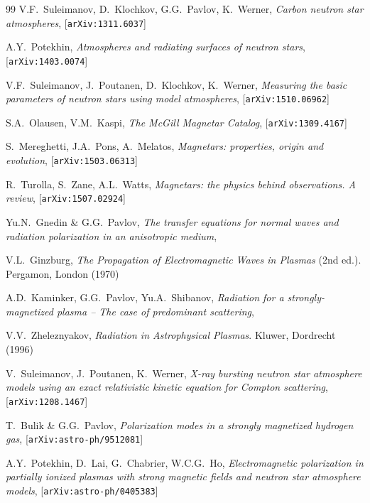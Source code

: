 \documentclass{pos1}
\begin{document}
\begin{thebibliography}{99}
V.F.~Suleimanov, D.~Klochkov, G.G.~Pavlov, K.~Werner,
\textit{Carbon neutron star atmospheres},
[\texttt{arXiv:1311.6037}]

A.Y.~Potekhin,
\textit{Atmospheres and radiating surfaces of neutron stars},
[\texttt{arXiv:1403.0074}]

V.F.~Suleimanov, J.~Poutanen, D.~Klochkov, K.~Werner,
\textit{Measuring the basic parameters of neutron stars using model atmospheres},
[\texttt{arXiv:1510.06962}]

S.A.~Olausen, V.M.~Kaspi,
\textit{The McGill Magnetar Catalog},
[\texttt{arXiv:1309.4167}]

S.~Mereghetti, J.A.~Pons, A.~Melatos,
\textit{Magnetars: properties, origin and evolution},
[\texttt{arXiv:1503.06313}]

R.~Turolla, S.~Zane, A.L.~Watts,
\textit{Magnetars: the physics behind observations. A review},
[\texttt{arXiv:1507.02924}]

Yu.N.~Gnedin \& G.G.~Pavlov,
\textit{The transfer equations for normal waves and radiation polarization in an anisotropic medium},

V.L.~Ginzburg,
\textit{The Propagation of Electromagnetic Waves in Plasmas}
(2nd ed.). Pergamon, London (1970)

A.D.~Kaminker, G.G.~Pavlov, Yu.A.~Shibanov,
\textit{Radiation for a strongly-magnetized plasma -- The case of predominant scattering},

V.V.~Zheleznyakov,
\textit{Radiation in Astrophysical Plasmas}.
Kluwer, Dordrecht (1996)

V.~Suleimanov, J.~Poutanen, K.~Werner,
\textit{X-ray bursting neutron star atmosphere models using an exact relativistic kinetic equation for Compton scattering},
[\texttt{arXiv:1208.1467}]

T.~Bulik \& G.G.~Pavlov,
\textit{Polarization modes in a strongly magnetized hydrogen gas},
[\texttt{arXiv:astro-ph/9512081}]

A.Y.~Potekhin, D.~Lai, G.~Chabrier, W.C.G.~Ho,
\textit{Electromagnetic polarization in partially ionized plasmas with strong magnetic fields  and neutron star atmosphere models},
[\texttt{arXiv:astro-ph/0405383}]


\end{thebibliography}
\end{document}
